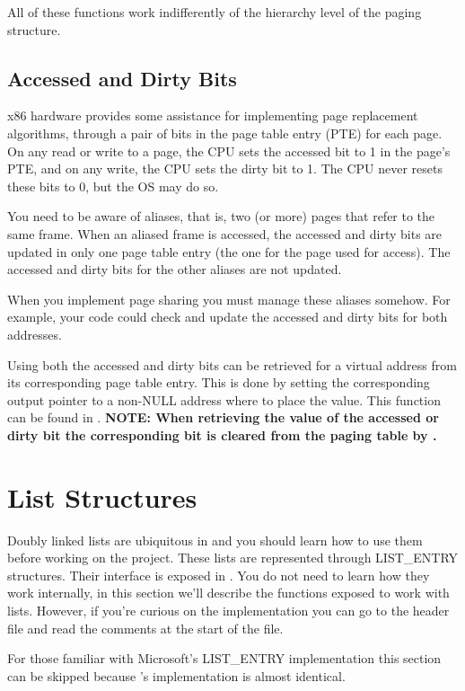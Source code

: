 \begin{appendices}
All of these functions work indifferently of the hierarchy level of the paging structure.

\subsection{Accessed and Dirty Bits}
\label{sect:ADBits}

x86 hardware provides some assistance for implementing page replacement algorithms, through a pair
of bits in the page table entry (PTE) for each page. On any read or write to a page, the CPU sets
the accessed bit to 1 in the page’s PTE, and on any write, the CPU sets the dirty bit to 1. The CPU
never resets these bits to 0, but the OS may do so.

You need to be aware of aliases, that is, two (or more) pages that refer to the same frame. When an
aliased frame is accessed, the accessed and dirty bits are updated in only one page table entry (the
one for the page used for access). The accessed and dirty bits for the other aliases are not updated.

When you implement page sharing you must manage these aliases somehow. For example, your code could
check and update the accessed and dirty bits for both addresses.

Using  both the accessed and dirty bits can be retrieved for a virtual
address from its corresponding page table entry. This is done by setting the corresponding output
pointer to a non-NULL address where to place the value. This function can be found in .
\textbf{NOTE: When retrieving the value of the accessed or dirty bit the corresponding bit is
cleared from the paging table by \projectname.}

\section{List Structures}
\label{sect:Lists}

Doubly linked lists are ubiquitous in \projectname and you should learn how to use them before
working on the project. These lists are represented through LIST\_ENTRY structures. Their interface
is exposed in . You do not need to learn how they work internally, in this section
we'll describe the functions exposed to work with lists. However, if you're curious on the
implementation  you can go to the header file and read the comments at the start of the file.

For those familiar with Microsoft's LIST\_ENTRY implementation this section can be skipped because
\projectname's implementation is almost identical.


\end{appendices}
